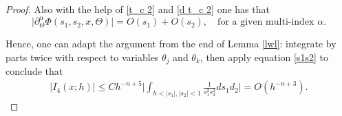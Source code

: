 \documentclass[10pt,a4paper]{amsart}
\begin{document}
\begin{proof}
Also with the help of \eqref{t_c 2} and \eqref{d t_c 2} one has that
\begin{equation}\label{s1s2}
\big|\partial_{\Theta}^\alpha \Phi(s_1, s_2, x,\Theta)\big|=O(s_1)+O(s_2), \quad\text{for a given multi-index } \alpha.
\end{equation}


Hence, one can adapt the argument from the end of Lemma \ref{lwl}: integrate by parts twice with respect to variables $\theta_j$ and $\theta_k$, then apply equation \eqref{s1s2} to conclude that
\begin{align}\label{last2'}
\Big| {I}_4 (x; h) \Big| \leq C h^{-n+5}  \Big|\int_{h<|s_1|,|s_2|<1}\frac{1}{s^2_1 s^2_2}  ds_1 d_2 \Big|=O(h^{-n+3}) .
\end{align}



\end{proof}
\end{document}
